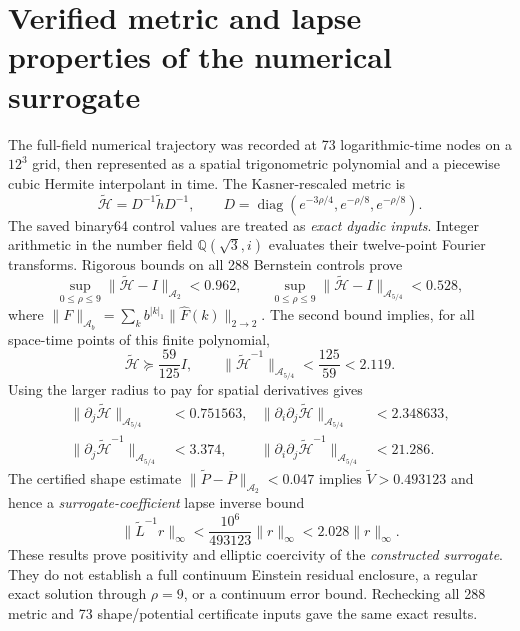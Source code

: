 \documentclass[11pt,a4paper]{article}
\theoremstyle{remark}
\begin{document}
\section{Verified metric and lapse properties of the numerical surrogate}
The full-field numerical trajectory was recorded at 73 logarithmic-time nodes on a $12^3$ grid, then represented as a spatial trigonometric polynomial and a piecewise cubic Hermite interpolant in time. The Kasner-rescaled metric is
\[
\widetilde{\mathcal H}=D^{-1}\widetilde hD^{-1},
\qquad D=\operatorname{diag}(e^{-3\rho/4},e^{-\rho/8},e^{-\rho/8}).
\]
The saved binary64 control values are treated as \emph{exact dyadic inputs}. Integer arithmetic in the number field $\mathbb Q(\sqrt3,i)$ evaluates their twelve-point Fourier transforms. Rigorous bounds on all 288 Bernstein controls prove
\begin{equation}\label{eq:two-radius}
\sup_{0\le\rho\le9}
\|\widetilde{\mathcal H}-I\|_{\mathcal A_2}<0.962,
\qquad
\sup_{0\le\rho\le9}
\|\widetilde{\mathcal H}-I\|_{\mathcal A_{5/4}}<0.528,
\end{equation}
where $\|F\|_{\mathcal A_b}=\sum_k b^{|k|_1}\|\widehat F(k)\|_{2\to2}$.
The second bound implies, for all space-time points of this finite polynomial,
\begin{equation}\label{eq:sur-inverse}
\widetilde{\mathcal H}\succeq\frac{59}{125}I,
\qquad\|\widetilde{\mathcal H}^{-1}\|_{\mathcal A_{5/4}}<\frac{125}{59}<2.119.
\end{equation}
Using the larger radius to pay for spatial derivatives gives
\begin{align}\label{eq:sur-derivative}
\|\partial_j\widetilde{\mathcal H}\|_{\mathcal A_{5/4}}&<0.751563, &
\|\partial_i\partial_j\widetilde{\mathcal H}\|_{\mathcal A_{5/4}}&<2.348633,\\
\|\partial_j\widetilde{\mathcal H}^{-1}\|_{\mathcal A_{5/4}}&<3.374, &
\|\partial_i\partial_j\widetilde{\mathcal H}^{-1}\|_{\mathcal A_{5/4}}&<21.286.
\end{align}
The certified shape estimate $\|\widetilde P-\overline P\|_{\mathcal A_2}<0.047$ implies $\widetilde V>0.493123$ and hence a \emph{surrogate-coefficient} lapse inverse bound
\begin{equation}\label{eq:sur-lapse}
\|\widetilde L^{-1}r\|_{\infty}
<\frac{10^6}{493123}\|r\|_\infty<2.028\|r\|_\infty.
\end{equation}
These results prove positivity and elliptic coercivity of the \emph{constructed surrogate}. They do not establish a full continuum Einstein residual enclosure, a regular exact solution through $\rho=9$, or a continuum error bound. Rechecking all 288 metric and 73 shape/potential certificate inputs gave the same exact results.
\end{document}

